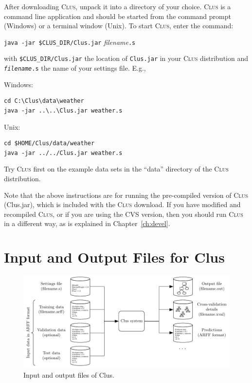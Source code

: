 \documentclass[a4paper]{report}
\newcommand{\clus}{\textsc{Clus}}
\begin{document}
After downloading \clus{}, unpack it into a directory of your choice. \clus{} is a command line application and should be started from the command prompt (Windows) or a terminal window (Unix). To start \clus{}, enter the command:
\begin{flushleft}
\verb^java -jar $CLUS_DIR/Clus.jar^ {\em filename}\verb^.s^
\end{flushleft}

\noindent{}with \verb^$CLUS_DIR/Clus.jar^ the location of \verb^Clus.jar^ in your \clus{} distribution and {\tt {\em filename}.s} the name of your settings file. E.g.,

\begin{list}{}{\leftmargin=1.5cm}
\item[Windows:]\mbox{}
\begin{verbatim}
cd C:\Clus\data\weather
java -jar ..\..\Clus.jar weather.s
\end{verbatim}

\item[Unix:]\mbox{}
\begin{verbatim}
cd $HOME/Clus/data/weather
java -jar ../../Clus.jar weather.s
\end{verbatim}
\end{list}

\noindent{}Try \clus{} first on the example data sets in the ``data'' directory of the \clus{} distribution.

Note that the above instructions are for running the pre-compiled version of \clus{} (Clus.jar), which is included with the \clus{} download. If you have modified and recompiled \clus{}, or if you are using the CVS version, then you should run \clus{} in a different way, as is explained in Chapter~\ref{ch:devel}.

\section{Input and Output Files for Clus}

\begin{figure}[tb]
\includegraphics{fig/clusinout}
\caption{\label{fig:iofiles}Input and output files of Clus.}
\end{figure}
\end{document}
